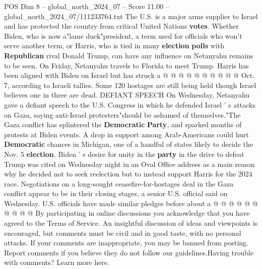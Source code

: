 \begin{textsample}{POS Dim 8 – global\_north\_2024\_07 – Score 11.00 – global\_north\_2024\_07/111233764.txt}
The U.S. is a major arms supplier to Israel and has protected the country from critical United Nations \textbf{votes}.
Whether Biden, who is now a"lame duck"president, a term used for officials who won't serve another term, or Harris, who is tied in many \textbf{election} \textbf{polls} with \textbf{Republican} rival Donald Trump, can have any influence on Netanyahu remains to be seen.
On Friday, Netanyahu travels to Florida to meet Trump.
Harris has been aligned with Biden on Israel but has struck a @ @ @ @ @ @ @ @ @ @ Oct. 7, according to Israeli tallies.
Some 120 hostages are still being held though Israel believes one in three are dead.
DEFIANT SPEECH On Wednesday, Netanyahu gave a defiant speech to the U.S.
Congress in which he defended Israel ' s attacks on Gaza, saying anti-Israel protesters"should be ashamed of themselves."The Gaza conflict has splintered the \textbf{Democratic} \textbf{Party}, and sparked months of protests at Biden events.
A drop in support among Arab-Americans could hurt \textbf{Democratic} chances in Michigan, one of a handful of states likely to decide the Nov. 5 \textbf{election}.
Biden ' s desire for unity in the \textbf{party} in the drive to defeat Trump was cited on Wednesday night in an Oval Office address as a main reason why he decided not to seek reelection but to instead support Harris for the 2024 race.
Negotiations on a long-sought ceasefire-for-hostages deal in the Gaza conflict appear to be in their closing stages, a senior U.S. official said on Wednesday.
U.S. officials have made similar pledges before about a @ @ @ @ @ @ @ @ @ @ By participating in online discussions you acknowledge that you have agreed to the Terms of Service.
An insightful discussion of ideas and viewpoints is encouraged, but comments must be civil and in good taste, with no personal attacks.
If your comments are inappropriate, you may be banned from posting.
Report comments if you believe they do not follow our guidelines.Having trouble with comments?
Learn more here.

\end{textsample}
